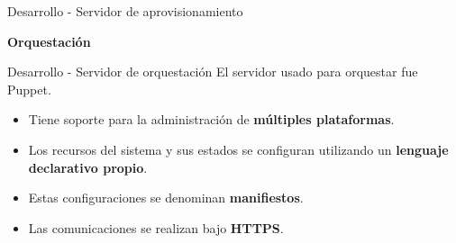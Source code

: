 \begin{frame}{Desarrollo - Servidor de aprovisionamiento}
    \vspace{0.5cm}
    \begin{figure}[ht]
       \centering
       \vspace{-0.50cm}
    \end{figure}
\end{frame}


%

\begin{frame}
    \Huge
    \centering
    \textbf{Orquestación}

\end{frame}

\begin{frame}{Desarrollo - Servidor de orquestación}
    \vspace{0cm}
    El servidor usado para orquestar fue Puppet. 
    \begin{itemize}
        \item Tiene soporte para la administración de \textbf{múltiples plataformas}.
        \item Los recursos del sistema y sus estados se configuran utilizando un \textbf{lenguaje declarativo propio}.
        \item Estas configuraciones se denominan \textbf{manifiestos}.
        \item Las comunicaciones se realizan bajo \textbf{HTTPS}.

    \end{itemize}

\end{frame}


